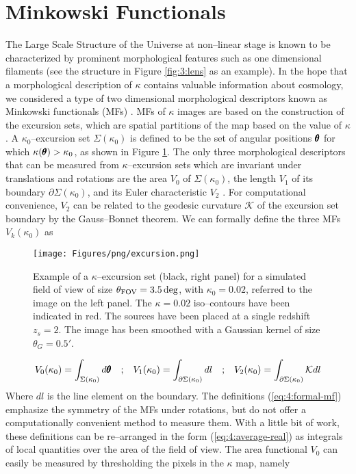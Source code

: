 
\section{Minkowski Functionals}
\label{sec:4:mink}
The Large Scale Structure of the Universe at non--linear stage is known to be characterized by prominent morphological features such as one dimensional filaments (see the structure in Figure \ref{fig:3:lens} as an example). In the hope that a morphological description of $\kappa$ contains valuable information about cosmology, we considered a type of two dimensional morphological descriptors known as Minkowski functionals (MFs) \citep{Tomita,MatsubaraLong,PetriMink,MinkJan,MinkShirasaki}. MFs of $\kappa$ images are based on the construction of the excursion sets, which are spatial partitions of the map based on the value of $\kappa$. A $\kappa_0$--excursion set $\Sigma(\kappa_0)$ is defined to be the set of angular positions $\pmb{\theta}$ for which $\kappa(\pmb{\theta})>\kappa_0$, as shown in Figure \ref{fig:4:excursion}. The only three morphological descriptors that can be measured from $\kappa$--excursion sets which are invariant under translations and rotations are the area $V_0$ of $\Sigma(\kappa_0)$, the length $V_1$ of its boundary $\partial\Sigma(\kappa_0)$, and its Euler characteristic $V_2$ \citep{MatsubaraLong}. For computational convenience, $V_2$ can be related to the geodesic curvature $\mathcal{K}$ of the excursion set boundary by the Gauss--Bonnet theorem. We can formally define the three MFs $V_k(\kappa_0)$ as 
%
\begin{figure}
\begin{center}
\texttt{[image: Figures/png/excursion.png]}
\end{center}
\caption{Example of a $\kappa$--excursion set (black, right panel) for a simulated field of view of size $\theta_{\rm FOV}=3.5\,{\rm deg}$, with $\kappa_0=0.02$, referred to the image on the left panel. The $\kappa=0.02$ iso--contours have been indicated in red. The sources have been placed at a single redshift $z_s=2$. The image has been smoothed with a Gaussian kernel of size $\theta_G=0.5'$.}
\label{fig:4:excursion}
\end{figure}
%
\begin{equation}
\label{eq:4:formal-mf}
\begin{matrix}
\displaystyle V_0(\kappa_0) = \int_{\Sigma(\kappa_0)} d\pmb{\theta} & ; & \displaystyle V_1(\kappa_0) = \int_{\partial\Sigma(\kappa_0)} dl & ; & \displaystyle V_2(\kappa_0) = \int_{\partial\Sigma(\kappa_0)}\mathcal{K}dl
\end{matrix}
\end{equation}   
%
Where $dl$ is the line element on the boundary. The definitions (\ref{eq:4:formal-mf}) emphasize the symmetry of the MFs under rotations, but do not offer a computationally convenient method to measure them. With a little bit of work, these definitions can be re--arranged in the form (\ref{eq:4:average-real}) as integrals of local quantities over the area of the field of view. The area functional $V_0$ can easily be measured by thresholding the pixels in the $\kappa$ map, namely

